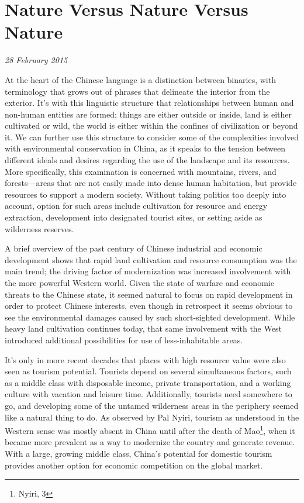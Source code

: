 \section{Nature Versus Nature Versus Nature}

\textit{28 February 2015}

At the heart of the Chinese language is a distinction between binaries, with
terminology that grows out of phrases that delineate the interior from the
exterior. It's with this linguistic structure that relationships between human
and non-human entities are formed; things are either outside or inside, land is
either cultivated or wild, the world is either within the confines of
civilization or beyond it. We can further use this structure to consider some of
the complexities involved with environmental conservation in China, as it speaks
to the tension between different ideals and desires regarding the use of the
landscape and its resources. More specifically, this examination is concerned
with mountains, rivers, and forests---areas that are not easily made into dense
human habitation, but provide resources to support a modern society. Without
taking politics too deeply into account, option for such areas include
cultivation for resource and energy extraction, development into designated
tourist sites, or setting aside as wilderness reserves.

A brief overview of the past century of Chinese industrial and economic
development shows that rapid land cultivation and resource consumption was the
main trend; the driving factor of modernization was increased involvement with
the more powerful Western world. Given the state of warfare and economic threats
to the Chinese state, it seemed natural to focus on rapid development in order
to protect Chinese interests, even though in retrospect it seems obvious to see
the environmental damages caused by such short-sighted development. While heavy
land cultivation continues today, that same involvement with the West introduced
additional possibilities for use of less-inhabitable areas.

It's only in more recent decades that places with high resource value were also
seen as tourism potential. Tourists depend on several
simultaneous factors, such as a middle class with disposable income, private
transportation, and a working culture with vacation and leisure time.
Additionally, tourists need somewhere to go, and developing some of the untamed
wilderness areas in the periphery seemed like a natural thing to do. As observed
by Pal Nyiri, tourism as understood in the Western sense was mostly absent in
China until after the death of Mao\footnote{Nyiri, 3}, when it became more
prevalent as a way to modernize the country and generate revenue. With a large,
growing middle class, China's potential for domestic tourism provides another
option for economic competition on the global market.

